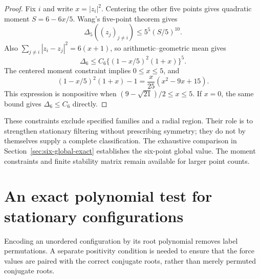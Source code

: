 \documentclass[11pt]{article}
\theoremstyle{remark}
\numberwithin{equation}{section}
\begin{document}
\begin{proof}
Fix $i$ and write $x=|z_i|^2$.  Centering the other five points
gives quadratic moment $S=6-6x/5$.  Wang's five-point theorem gives
\[
 \Delta_5((z_j)_{j\ne i})\le5^5(S/5)^{10}.
\]
Also $\sum_{j\ne i}|z_i-z_j|^2=6(x+1)$, so arithmetic--geometric
mean gives
\[
 \Delta_6\le C_6\{(1-x/5)^2(1+x)\}^5.
\]
The centered moment constraint implies $0\le x\le5$, and
\[
 (1-x/5)^2(1+x)-1=\frac{x}{25}(x^2-9x+15).
\]
This expression is nonpositive when
$(9-\sqrt{21})/2\le x\le5$.
If $x=0$, the same bound gives $\Delta_6\le C_6$ directly.
\end{proof}

These constraints exclude specified families and a radial region.
Their role is to strengthen stationary filtering without prescribing
symmetry; they do not by themselves supply a complete classification.
The exhaustive comparison in Section~\ref{sec:six-global-exact}
establishes the six-point global value. The moment constraints and
finite stability matrix remain available for larger point counts.

\section{An exact polynomial test for stationary configurations}
\label{sec:trace-stationary}
Encoding an unordered configuration by its root polynomial removes
label permutations. A separate positivity condition is needed to
ensure that the force values are paired with the correct conjugate
roots, rather than merely permuted conjugate roots.
\end{document}

